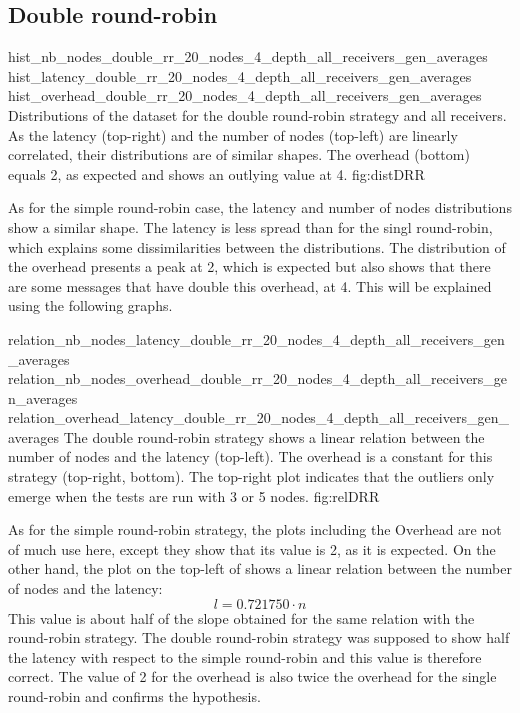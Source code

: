 \FloatBarrier
\subsection{Double round-robin}
\triplefigure
    {hist_nb_nodes_double_rr_20_nodes_4_depth_all_receivers_gen_averages}
    {hist_latency_double_rr_20_nodes_4_depth_all_receivers_gen_averages}
    {hist_overhead_double_rr_20_nodes_4_depth_all_receivers_gen_averages}
    {Distributions of the dataset for the double round-robin strategy and all
    receivers. As the latency (top-right) and the number of nodes (top-left) are
    linearly correlated, their distributions are of similar shapes. The
    overhead (bottom) equals 2, as expected and shows an outlying value at 4.}
    {fig:distDRR}

As for the simple round-robin case, the latency and number of nodes
distributions show a similar shape. The latency is less spread than for the
singl round-robin, which explains some dissimilarities between the
distributions. The distribution of the overhead presents a peak at 2, which is
expected but also shows that there are some messages that have double this
overhead, at 4. This will be explained using the following graphs. 

\triplefigure
    {relation_nb_nodes_latency_double_rr_20_nodes_4_depth_all_receivers_gen_averages}
    {relation_nb_nodes_overhead_double_rr_20_nodes_4_depth_all_receivers_gen_averages}
    {relation_overhead_latency_double_rr_20_nodes_4_depth_all_receivers_gen_averages}
    {The double round-robin strategy shows a linear relation between the number of
    nodes and the latency (top-left). The overhead is a constant for this
    strategy (top-right, bottom). The top-right plot indicates that the outliers
    only emerge when the tests are run with 3 or 5 nodes.}
    {fig:relDRR}

As for the simple round-robin strategy, the plots including the Overhead are not
of much use here, except they show that its value is 2, as it is expected. 
On the other hand, the plot on the top-left of  shows a
linear relation between the number of nodes and the latency: 
\[l = 0.721750 \cdot n\]
This value is about half of the slope obtained for the same relation with the
round-robin strategy. The double round-robin strategy was supposed to show half
the latency with respect to the simple round-robin and this value is therefore
correct. The value of 2 for the overhead is also twice the overhead for the
single round-robin and confirms the hypothesis.
    

